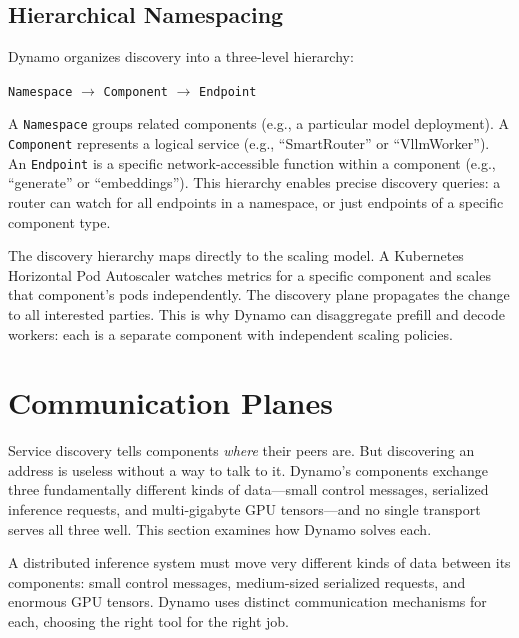 \subsection{Hierarchical Namespacing}

Dynamo organizes discovery into a three-level hierarchy:

\begin{center}
\texttt{Namespace} $\rightarrow$ \texttt{Component} $\rightarrow$ \texttt{Endpoint}
\end{center}

A \texttt{Namespace} groups related components (e.g., a particular model deployment). A \texttt{Component} represents a logical service (e.g., ``SmartRouter'' or ``VllmWorker''). An \texttt{Endpoint} is a specific network-accessible function within a component (e.g., ``generate'' or ``embeddings''). This hierarchy enables precise discovery queries: a router can watch for all endpoints in a namespace, or just endpoints of a specific component type.

\begin{insightbox}
The discovery hierarchy maps directly to the scaling model. A Kubernetes Horizontal Pod Autoscaler watches metrics for a specific component and scales that component's pods independently. The discovery plane propagates the change to all interested parties. This is why Dynamo can disaggregate prefill and decode workers: each is a separate component with independent scaling policies.
\end{insightbox}

\section{Communication Planes}
\label{sec:architecture:comms}

Service discovery tells components \emph{where} their peers are. But discovering an address is useless without a way to talk to it. Dynamo's components exchange three fundamentally different kinds of data---small control messages, serialized inference requests, and multi-gigabyte GPU tensors---and no single transport serves all three well. This section examines how Dynamo solves each.

A distributed inference system must move very different kinds of data between its components: small control messages, medium-sized serialized requests, and enormous GPU tensors. Dynamo uses distinct communication mechanisms for each, choosing the right tool for the right job.

